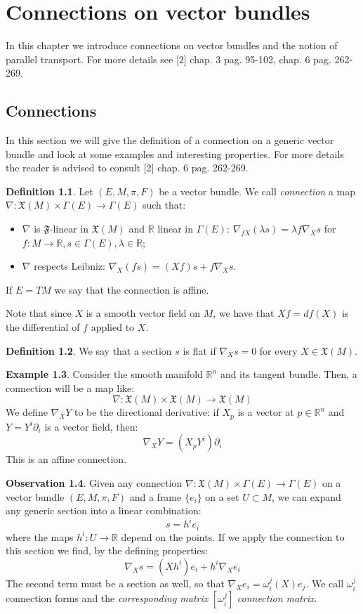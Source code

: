 \documentclass[12pt,a4paper]{report}
\theoremstyle{definition}
\newtheorem{Def}{Definition}[chapter]
\theoremstyle{Theorem}
\theoremstyle{definition}
\newtheorem{Ex}[Def]{Example}
\theoremstyle{definition}
\newtheorem{Obs}[Def]{Observation}
\begin{document}
	\chapter{Connections on vector bundles}
	In this chapter we introduce connections on vector bundles and the notion of parallel transport. For more details see [2] chap. 3 pag. 95-102, chap. 6 pag. 262-269.
	\section{Connections}
	In this section we will give the definition of a connection on a generic vector bundle and look at some examples and interesting properties. For more details the reader is advised to consult [2] chap. 6 pag. 262-269.
	\begin{Def}\label{Def_5.7}
		Let $(E,M,\pi,F)$ be a vector bundle. We call \textit{connection} a map $\nabla:\mathfrak{X}(M)\times\Gamma(E)\rightarrow\Gamma(E)$ such that:
		\begin{itemize}
			\item $\nabla$ is $\mathfrak{F}$-linear in $\mathfrak{X}(M)$ and $\mathbb{R}$ linear in $\Gamma(E)$: $\nabla_{fX}(\lambda s)=\lambda f\nabla_X s$ for $f:M\rightarrow \mathbb{R}, s\in\Gamma(E),\lambda\in\mathbb{R}$;
			\item $\nabla$ respects Leibniz: $\nabla_X (fs)=(Xf)s+f\nabla_X s$.
		\end{itemize}
		If $E=TM$ we say that the connection is affine.
	\end{Def}
	Note that since $X$ is a smooth vector field on $M$, we have that $Xf=df(X)$ is the differential of $f$ applied to $X$.
	\begin{Def}\label{Def_5.8}
		We say that a section $s$ is flat if $\nabla_X s=0$ for every $X\in \mathfrak{X}(M)$.
	\end{Def}
	\begin{Ex}
		Consider the smooth manifold $\mathbb{R}^n$ and its tangent bundle. Then, a connection will be a map like:
		$$\nabla:\mathfrak{X}(M)\times\mathfrak{X}(M)\rightarrow\mathfrak{X}(M)$$
		We define $\nabla_XY$ to be the directional derivative: if $X_p$ is a vector at $p\in\mathbb{R}^n$ and $Y=Y^i\partial_i$ is a vector field, then:
		$$\nabla_XY=(X_pY^i)\partial_i$$
		This is an affine connection.
	\end{Ex}
	\begin{Obs}
		Given any connection $\nabla:\mathfrak{X}(M)\times\Gamma(E)\rightarrow\Gamma(E)$ on a vector bundle $(E,M,\pi,F)$ and a frame $\{e_i\}$ on a set $U\subset M$, we can expand any generic section into a linear combination:
		$$s=h^ie_i$$
		where the maps $h^i:U\rightarrow \mathbb{R}$ depend on the points. If we apply the connection to this section we find, by the defining properties:
		$$\nabla_Xs=(Xh^i)e_i+h^i\nabla_Xe_i$$
		The second term must be a section as well, so that $\nabla_Xe_i=\omega^j_i(X)e_j$. We call $\omega^j_i$ connection forms and the \textit{corresponding matrix} $[\omega^j_i]$ \textit{connection matrix}. 
	\end{Obs}
\end{document}
